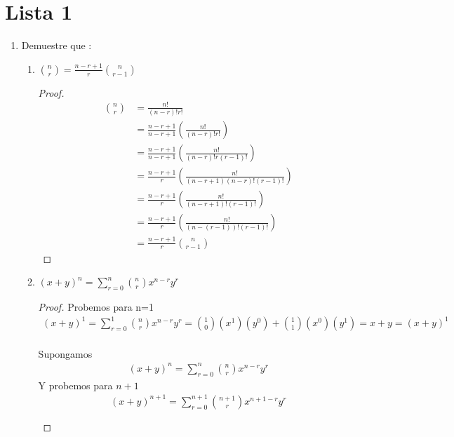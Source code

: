 \section{Lista 1}
\begin{enumerate}
    \item Demuestre que :
        \begin{enumerate}
            \item $\binom{n}{r} = \frac{n-r+1}{r}\binom{n}{r-1}$
            \begin{proof}
                \begin{align*}
                    \binom{n}{r} &= \frac{n!}{(n-r)!r!}\\
                    &= \frac{n-r+1}{n-r+1}(\frac{n!}{(n-r)!r!})\\
                    &= \frac{n-r+1}{n-r+1}(\frac{n!}{(n-r)!r(r-1)!})\\
                    &= \frac{n-r+1}{r}(\frac{n!}{(n-r+1)(n-r)!(r-1)!})\\
                    &= \frac{n-r+1}{r}(\frac{n!}{(n-r+1)!(r-1)!})\\
                    &= \frac{n-r+1}{r}(\frac{n!}{(n-(r-1))!(r-1)!})  \\
                    &= \frac{n-r+1}{r}\binom{n}{r-1}
                \end{align*}
            \end{proof}
            \item $(x+y)^n =\sum_{r=0}^{n} \binom{n}{r} x^{n-r}y^{r}$
            \begin{proof}
                Probemos para n=1
                \begin{gather*}
                (x+y)^1 = \sum_{r=0}^{1} \binom{n}{r} x^{n-r}y^{r}=  \binom{1}{0}(x^1)(y^0) + \binom{1}{1}(x^0)(y^1)= x + y =(x+y)^1 
                \end{gather*}\\  
                Supongamos 
                \begin{gather*}  
                (x+y)^n =   \sum_{r=0}^{n} \binom{n}{r} x^{n-r}y^{r}
                \end{gather*}
                Y probemos para $n+1$
                \begin{gather*}
                (x+y)^{n+1} = \sum_{r=0}^{n+1} \binom{n+1}{r} x^{n+1-r}y^{r}\\\
                \end{gather*}    
                \begin{align*}

\end{align*}
\end{proof}
\end{enumerate}
\end{enumerate}
